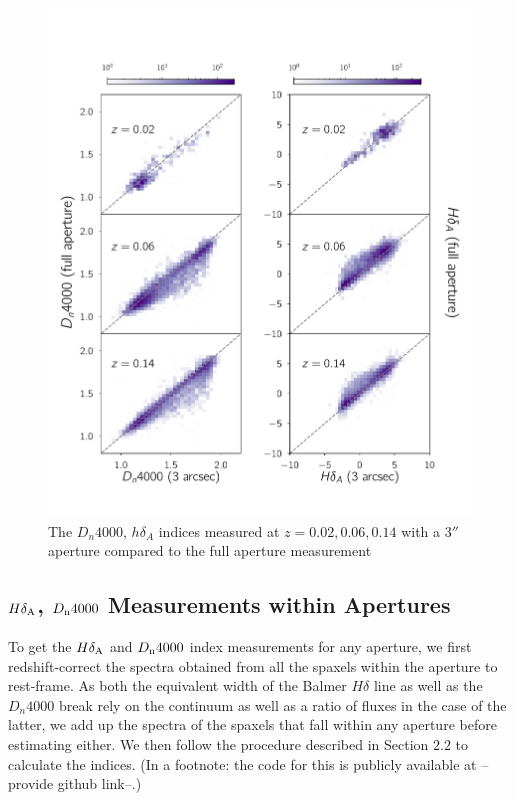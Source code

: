 \begin{figure}
\includegraphics[width=\textwidth]{figures/full_aperture_comparisons.pdf}
\caption[Short figure name.]{ The $D_{n}4000$, $h\delta_{A}$ indices measured at $z = 0.02,0.06,0.14$ with a $3''$ aperture compared to the full aperture measurement
\label{fig:myInlineFigure}}
\end{figure}


\subsection{$H\delta_{\rm A}$, $D_{\rm n}4000$ Measurements within Apertures}
To get the $H\delta_{\rm A}$ and $D_{\rm n}4000$ index measurements for any aperture, we first redshift-correct the spectra obtained from all the spaxels within the aperture to rest-frame. As both the equivalent width of the Balmer $H\delta$ line as well as the $D_{n}4000$ break rely on the continuum as well as a ratio of fluxes in the case of the latter, we add up the spectra of the spaxels that fall within any aperture before estimating either. We then follow the procedure described in Section $2.2$ to calculate the indices. (In a footnote: the code for this is publicly available at --provide github link--.)


